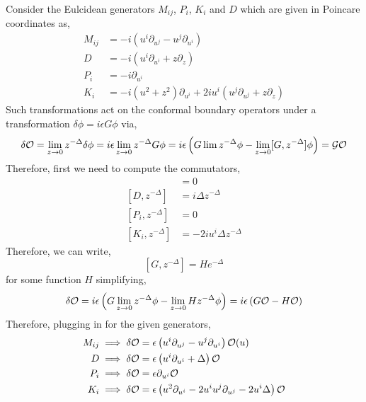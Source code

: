 \documentclass[12pt]{article}
\begin{document}
Consider the Eulcidean generators $M_{ij}$, $P_i$, $K_i$ and $D$ which are given in Poincare coordinates as,
\begin{align*}
M_{ij} & = - i (u^i \partial_{u^j} - u^j \partial_{u^i}) 
\\
D & = - i ( u^i \partial_{u^i} + z \partial_z) 
\\
P_i & = - i \partial_{u^i}
\\
K_i & = - i(u^2 + z^2) \partial_{u^i} + 2 i u^i (u^j \partial_{u^j} + z \partial_z) 
\end{align*}
Such transformations act on the conformal boundary operators under a transformation $\delta \phi = i \epsilon G \phi$ via,
\begin{align*}
\delta \mathcal{O} = \lim_{z \to 0} z^{-\Delta} \delta \phi = i \epsilon \lim_{z \to 0} z^{-\Delta} G \phi = i \epsilon \left( G \lim z^{-\Delta} \phi - \lim_{z \to 0} [G, z^{-\Delta}] \phi \right) = \mathcal{G} \mathcal{O}
\end{align*}
Therefore, first we need to compute the commutators,
\begin{align*}
[M_{ij}, z^{-\Delta}] & = 0
\\
[D, z^{-\Delta}] & = i \Delta z^{-\Delta}
\\
[P_i, z^{-\Delta}] & = 0
\\
[K_i, z^{-\Delta}] & = - 2 i u^i \Delta z^{-\Delta}
\end{align*}
Therefore, we can write,
\[ [G, z^{-\Delta}] = H e^{-\Delta} \]
for some function $H$ simplifying,
\[ \delta \mathcal{O} = i \epsilon \left( G \lim_{z \to 0} z^{-\Delta} \phi - \lim_{z \to 0} H z^{-\Delta} \phi \right) = i \epsilon \left( G \mathcal{O} - H \mathcal{O} \right) \]
Therefore, plugging in for the given generators,
\begin{align*}
M_{ij} & \implies \delta \mathcal{O} = \epsilon \left( u^i \partial_{u^j} - u^j \partial_{u^i} \right) \mathcal{O}(u)
\\
D & \implies \delta \mathcal{O} = \epsilon \left( u^i \partial_{u^i} + \Delta \right) \mathcal{O}
\\
P_i & \implies \delta \mathcal{O} = \epsilon \partial_{u^i} \mathcal{O}
\\
K_i & \implies \delta \mathcal{O} = \epsilon \left( u^2 \partial_{u^i} - 2 u^i u^j \partial_{u^j} - 2 u^i \Delta  \right) \mathcal{O}
\end{align*}
\end{document}
